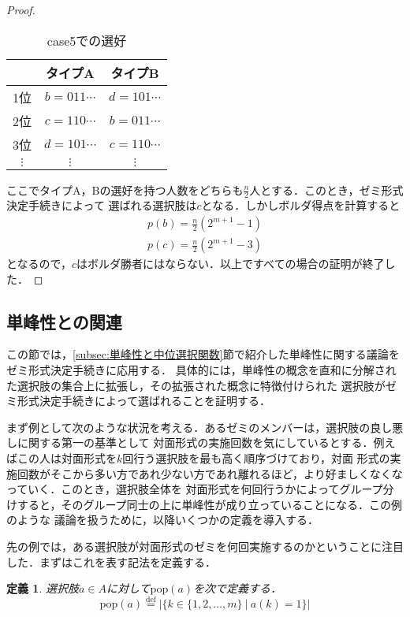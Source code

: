 \documentclass[dvipdfmx]{jsarticle}
\newtheorem{definition}{定義}[section]
\begin{document}
\begin{proof}
  \begin{table}[h]
    \caption{case5での選好}\label{tab:case5}
    \begin{center}
      \begin{tabular}{c|c|c}\hline
          & タイプA & タイプB \\ \hline
        1位 & $b = 011\cdots$ & $d = 101\cdots$ \\
        2位 & $c = 110\cdots$ & $b = 011\cdots$ \\
        3位 & $d = 101\cdots$ & $c = 110\cdots$ \\
        $\vdots$ & $\vdots$ & $\vdots$ \\ \hline
      \end{tabular}
    \end{center}
  \end{table}

  \noindent{}ここでタイプA，Bの選好を持つ人数をどちらも$\frac{n}{2}$人とする．このとき，ゼミ形式決定手続きによって
  選ばれる選択肢は$c$となる．しかしボルダ得点を計算すると
  \begin{gather*}
    p(b) = \frac{n}{2}(2^{m+1}-1) \\
    p(c) = \frac{n}{2}(2^{m+1}-3)
  \end{gather*}
  となるので，$c$はボルダ勝者にはならない．以上ですべての場合の証明が終了した．
\end{proof}

\subsection{単峰性との関連}\label{subsec:単峰性との関連}
  この節では，\ref{subsec:単峰性と中位選択関数}節で紹介した単峰性に関する議論をゼミ形式決定手続きに応用する．
  具体的には，単峰性の概念を直和に分解された選択肢の集合上に拡張し，その拡張された概念に特徴付けられた
  選択肢がゼミ形式決定手続きによって選ばれることを証明する．

  まず例として次のような状況を考える．あるゼミのメンバーは，選択肢の良し悪しに関する第一の基準として
  対面形式の実施回数を気にしているとする．例えばこの人は対面形式を$k$回行う選択肢を最も高く順序づけており，対面
  形式の実施回数がそこから多い方であれ少ない方であれ離れるほど，より好ましくなくなっていく．このとき，選択肢全体を
  対面形式を何回行うかによってグループ分けすると，そのグループ同士の上に単峰性が成り立っていることになる．この例のような
  議論を扱うために，以降いくつかの定義を導入する．

  先の例では，ある選択肢が対面形式のゼミを何回実施するのかということに注目した．まずはこれを表す記法を定義する．
  \begin{definition}
    選択肢$a \in A$に対して$\mathrm{pop}(a)$を次で定義する．
    \[
      \mathrm{pop}(a) \stackrel{\mathrm{def}}{=} |\{k \in \{1, 2, \ldots, m \} \ | \
      a(k) = 1 \}|
    \]
  \end{definition}
\end{document}
